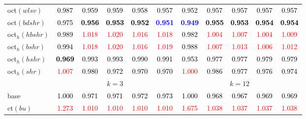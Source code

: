 \begin{tabular}[t]{l|>{}cccc>{}c|ccccc}
oct$(wlsv)$ & \textcolor{black}{0.987} & \textcolor{black}{0.959} & \textcolor{black}{0.959} & \textcolor{black}{0.958} & \textcolor{black}{0.957} & \textcolor{black}{0.952} & \textcolor{black}{0.957} & \textcolor{black}{0.957} & \textcolor{black}{0.957} & \textcolor{black}{0.957}\\
oct$(bdshr)$ & \textcolor{black}{0.975} & \textcolor{black}{\textbf{0.956}} & \textcolor{black}{\textbf{0.953}} & \textcolor{black}{\textbf{0.952}} & \textcolor{blue}{\textbf{0.951}} & \textcolor{blue}{\textbf{0.949}} & \textcolor{black}{\textbf{0.955}} & \textcolor{black}{\textbf{0.953}} & \textcolor{black}{\textbf{0.954}} & \textcolor{black}{\textbf{0.954}}\\
oct$_h(hbshr)$ & \textcolor{black}{0.989} & \textcolor{red}{1.018} & \textcolor{red}{1.020} & \textcolor{red}{1.016} & \textcolor{red}{1.018} & \textcolor{black}{0.982} & \textcolor{red}{1.004} & \textcolor{red}{1.007} & \textcolor{red}{1.004} & \textcolor{red}{1.009}\\
oct$_h(bshr)$ & \textcolor{black}{0.994} & \textcolor{red}{1.018} & \textcolor{red}{1.020} & \textcolor{red}{1.016} & \textcolor{red}{1.019} & \textcolor{black}{0.988} & \textcolor{red}{1.007} & \textcolor{red}{1.013} & \textcolor{red}{1.006} & \textcolor{red}{1.012}\\
oct$_h(hshr)$ & \textcolor{black}{\textbf{0.969}} & \textcolor{black}{0.993} & \textcolor{black}{0.993} & \textcolor{black}{0.990} & \textcolor{black}{0.991} & \textcolor{black}{0.953} & \textcolor{black}{0.977} & \textcolor{black}{0.977} & \textcolor{black}{0.979} & \textcolor{black}{0.979}\\
oct$_h(shr)$ & \textcolor{red}{1.007} & \textcolor{black}{0.980} & \textcolor{black}{0.972} & \textcolor{black}{0.970} & \textcolor{black}{0.970} & \textcolor{red}{1.000} & \textcolor{black}{0.986} & \textcolor{black}{0.977} & \textcolor{black}{0.976} & \textcolor{black}{0.974}\\
\addlinespace[0.3em]
\multicolumn{1}{c}{} & \multicolumn{5}{c}{\textbf{$k = 3$}} & \multicolumn{5}{c}{\textbf{$k = 12$}}\\
base & \textcolor{black}{1.000} & \textcolor{black}{0.971} & \textcolor{black}{0.971} & \textcolor{black}{0.972} & \textcolor{black}{0.973} & \textcolor{black}{1.000} & \textcolor{black}{0.968} & \textcolor{black}{0.967} & \textcolor{black}{0.969} & \textcolor{black}{0.969}\\
ct$(bu)$ & \textcolor{red}{1.273} & \textcolor{red}{1.010} & \textcolor{red}{1.010} & \textcolor{red}{1.010} & \textcolor{red}{1.010} & \textcolor{red}{1.675} & \textcolor{red}{1.038} & \textcolor{red}{1.037} & \textcolor{red}{1.037} & \textcolor{red}{1.038}\\

\end{tabular}
